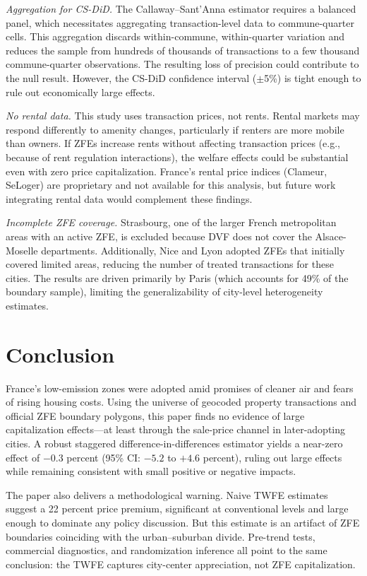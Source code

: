 \documentclass[12pt]{article}
\begin{document}
\textit{Aggregation for CS-DiD.} The Callaway--Sant'Anna estimator requires a balanced panel, which necessitates aggregating transaction-level data to commune-quarter cells. This aggregation discards within-commune, within-quarter variation and reduces the sample from hundreds of thousands of transactions to a few thousand commune-quarter observations. The resulting loss of precision could contribute to the null result. However, the CS-DiD confidence interval ($\pm$5\%) is tight enough to rule out economically large effects.

\textit{No rental data.} This study uses transaction prices, not rents. Rental markets may respond differently to amenity changes, particularly if renters are more mobile than owners. If ZFEs increase rents without affecting transaction prices (e.g., because of rent regulation interactions), the welfare effects could be substantial even with zero price capitalization. France's rental price indices (Clameur, SeLoger) are proprietary and not available for this analysis, but future work integrating rental data would complement these findings.

\textit{Incomplete ZFE coverage.} Strasbourg, one of the larger French metropolitan areas with an active ZFE, is excluded because DVF does not cover the Alsace-Moselle departments. Additionally, Nice and Lyon adopted ZFEs that initially covered limited areas, reducing the number of treated transactions for these cities. The results are driven primarily by Paris (which accounts for 49\% of the boundary sample), limiting the generalizability of city-level heterogeneity estimates.


\section{Conclusion} \label{sec:conclusion}

France's low-emission zones were adopted amid promises of cleaner air and fears of rising housing costs. Using the universe of geocoded property transactions and official ZFE boundary polygons, this paper finds no evidence of large capitalization effects---at least through the sale-price channel in later-adopting cities. A robust staggered difference-in-differences estimator yields a near-zero effect of $-0.3$ percent (95\% CI: $-5.2$ to $+4.6$ percent), ruling out large effects while remaining consistent with small positive or negative impacts.

The paper also delivers a methodological warning. Naive TWFE estimates suggest a 22 percent price premium, significant at conventional levels and large enough to dominate any policy discussion. But this estimate is an artifact of ZFE boundaries coinciding with the urban--suburban divide. Pre-trend tests, commercial diagnostics, and randomization inference all point to the same conclusion: the TWFE captures city-center appreciation, not ZFE capitalization.
\end{document}
